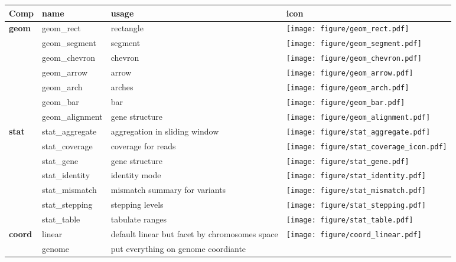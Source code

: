 \documentclass[a4paper, 11pt]{article}
\begin{document}
\begin{table}[h!t!b!p]
\small{
\begin{tabular}{|p{1cm}|p{2cm}|p{4cm}|p{1cm}|}
\hline
Comp & name  & usage & icon\\\hline
\textbf{geom} &geom\_rect & rectangle& \texttt{[image: figure/geom\_rect.pdf]}\\
              &geom\_segment & segment& \texttt{[image: figure/geom\_segment.pdf]}\\
              &geom\_chevron & chevron&\texttt{[image: figure/geom\_chevron.pdf]}\\
              &geom\_arrow & arrow&\texttt{[image: figure/geom\_arrow.pdf]}\\
              &geom\_arch & arches &\texttt{[image: figure/geom\_arch.pdf]}\\
              &geom\_bar & bar &\texttt{[image: figure/geom\_bar.pdf]}\\
              &geom\_alignment & gene structure& 
              \texttt{[image: figure/geom\_alignment.pdf]}\\\hline
\textbf{stat} &stat\_aggregate & aggregation in sliding window&
              \texttt{[image: figure/stat\_aggregate.pdf]}\\
              &stat\_coverage & coverage for reads&
              \texttt{[image: figure/stat\_coverage\_icon.pdf]}\\
              &stat\_gene & gene structure&
              \texttt{[image: figure/stat\_gene.pdf]}\\
              &stat\_identity & identity mode &
              \texttt{[image: figure/stat\_identity.pdf]}\\
              &stat\_mismatch & mismatch summary for variants&
              \texttt{[image: figure/stat\_mismatch.pdf]}\\
              &stat\_stepping & stepping levels&
              \texttt{[image: figure/stat\_stepping.pdf]}\\
              &stat\_table & tabulate ranges &
              \texttt{[image: figure/stat\_table.pdf]}\\\hline
\textbf{coord} &linear& default linear but facet by chromosomes space&
               \texttt{[image: figure/coord\_linear.pdf]}\\
               &genome& put everything on genome coordiante&

\end{tabular}}
\end{table}
\end{document}
